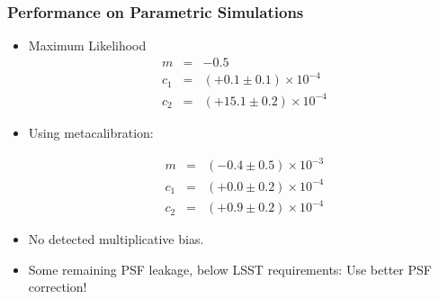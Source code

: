 \documentclass{beamer}
\newcommand{\mcal}{metacalibration}
\begin{document}
\frame
{
    \frametitle{Performance on Parametric Simulations}

 
    \begin{itemize}


        \item Maximum Likelihood 
            {\color{brightred} 
                \begin{eqnarray}
                    m & = & -0.5  \nonumber \\
                  c_1 & = & (+0.1 \pm 0.1) \times 10^{-4} \nonumber \\
                  c_2 & = & (+15.1 \pm 0.2) \times 10^{-4} \nonumber
                \end{eqnarray}
            }


        \item Using \mcal:

            {\color{gold} 
                \begin{eqnarray}
                    m & = & (-0.4 \pm 0.5) \times 10^{-3} \nonumber \\
                  c_1 & = & (+0.0 \pm 0.2) \times 10^{-4} \nonumber \\
                  c_2 & = & (+0.9 \pm 0.2) \times 10^{-4} \nonumber
                \end{eqnarray}
            }

        \item No detected multiplicative bias.
        \item Some remaining PSF leakage, below LSST requirements: Use
            better PSF correction!

    \end{itemize}

}
\end{document}
